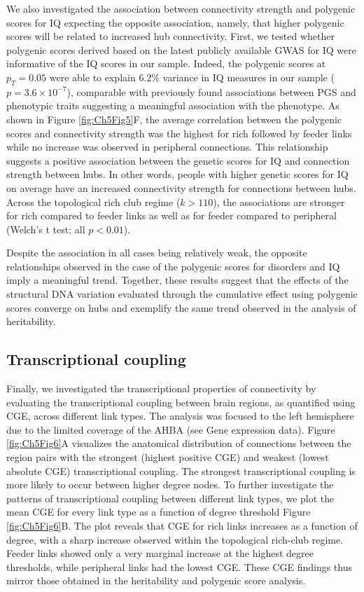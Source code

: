 We also investigated the association between connectivity strength and polygenic scores for IQ expecting the opposite association, namely, that higher polygenic scores will be related to increased hub connectivity. First, we tested whether polygenic scores derived based on the latest publicly available GWAS for IQ \citep{Savage2018} were informative of the IQ scores in our sample. Indeed, the polygenic scores at $p_{T} = 0.05$ were able to explain $6.2\%$ variance in IQ measures in our sample ($p = 3.6 \times 10^{-7}$), comparable with previously found associations between PGS and phenotypic traits \citep{Euesden2015} suggesting a meaningful association with the phenotype. As shown in Figure \ref{fig:Ch5Fig5}F, the average correlation between the polygenic scores and connectivity strength was the highest for rich followed by feeder links while no increase was observed in peripheral connections. This relationship suggests a positive association between the genetic scores for IQ and connection strength between hubs. In other words, people with higher genetic scores for IQ on average have an increased connectivity strength for connections between hubs. Across the topological rich club regime ($k > 110$), the associations are stronger for rich compared to feeder links as well as for feeder compared to peripheral (Welch's t test; all $p<0.01$).


Despite the association in all cases being relatively weak, the opposite relationships observed in the case of the polygenic scores for disorders and IQ imply a meaningful trend. Together, these results suggest that the effects of the structural DNA variation evaluated through the cumulative effect using polygenic scores converge on hubs and exemplify the same trend observed in the analysis of heritability.

\subsection{Transcriptional coupling} 

Finally, we investigated the transcriptional properties of connectivity by evaluating the transcriptional coupling between brain regions, as quantified using CGE, across different link types. The analysis was focused to the left hemisphere due to the limited coverage of the AHBA (see Gene expression data). Figure \ref{fig:Ch5Fig6}A visualizes the anatomical distribution of connections between the region pairs with the strongest (highest positive CGE) and weakest (lowest absolute CGE) transcriptional coupling. The strongest transcriptional coupling is more likely to occur between higher degree nodes. To further investigate the patterns of transcriptional coupling between different link types, we plot the mean CGE for every link type as a function of degree threshold Figure \ref{fig:Ch5Fig6}B. The plot reveals that CGE for rich links increases as a function of degree, with a sharp increase observed within the topological rich-club regime. Feeder links showed only a very marginal increase at the highest degree thresholds, while peripheral links had the lowest CGE. These CGE findings thus mirror those obtained in the heritability and polygenic score analysis.

